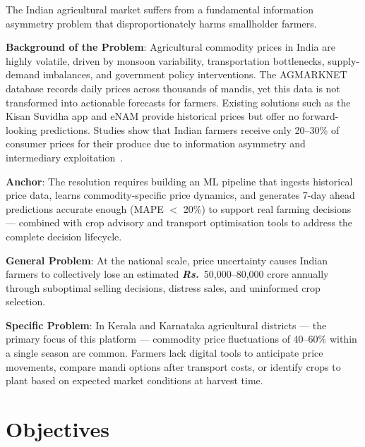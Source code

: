 \documentclass[12pt,a4paper]{report}
\newcommand{\rupee}{\textrm{\textit{\textbf{Rs.}}}}
\begin{document}
The Indian agricultural market suffers from a fundamental information asymmetry problem
that disproportionately harms smallholder farmers.

\textbf{Background of the Problem}: Agricultural commodity prices in India are highly
volatile, driven by monsoon variability, transportation bottlenecks, supply-demand
imbalances, and government policy interventions. The AGMARKNET database records daily
prices across thousands of mandis, yet this data is not transformed into actionable
forecasts for farmers. Existing solutions such as the Kisan Suvidha app and eNAM
provide historical prices but offer no forward-looking predictions. Studies show that
Indian farmers receive only 20--30\% of consumer prices for their produce due to
information asymmetry and intermediary exploitation~\cite{farmersIncome}.

\textbf{Anchor}: The resolution requires building an ML pipeline that ingests historical
price data, learns commodity-specific price dynamics, and generates 7-day ahead predictions
accurate enough (MAPE $<$ 20\%) to support real farming decisions --- combined with crop
advisory and transport optimisation tools to address the complete decision lifecycle.

\textbf{General Problem}: At the national scale, price uncertainty causes Indian farmers
to collectively lose an estimated \rupee~50,000--80,000 crore annually through suboptimal
selling decisions, distress sales, and uninformed crop selection.

\textbf{Specific Problem}: In Kerala and Karnataka agricultural districts --- the primary
focus of this platform --- commodity price fluctuations of 40--60\% within a single season
are common. Farmers lack digital tools to anticipate price movements, compare mandi options
after transport costs, or identify crops to plant based on expected market conditions at
harvest time.

\section{Objectives}
\end{document}
